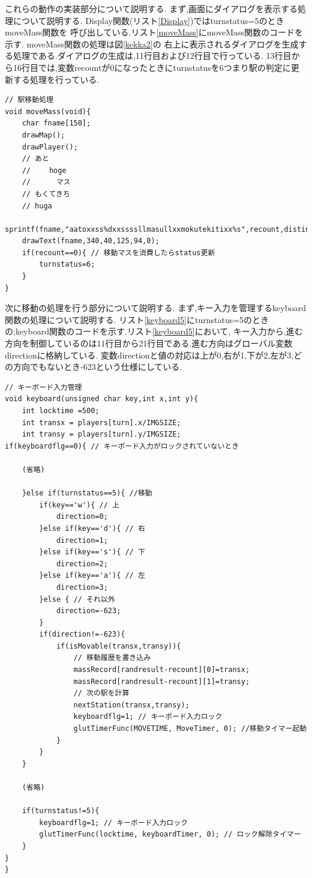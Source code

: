 \documentclass[a4j]{jarticle}
\begin{document}
    これらの動作の実装部分について説明する. まず,画面にダイアログを表示する処理について説明する. Display関数(リスト\ref{Display})ではturnstatus=5のときmoveMass関数を
    呼び出している.リスト\ref{moveMass}にmoveMass関数のコードを示す. moveMass関数の処理は図\ref{kekka2}の
    右上に表示されるダイアログを生成する処理である.ダイアログの生成は,11行目および12行目で行っている.
    13行目から16行目では,変数recountが0になったときにturnstatusを6つまり駅の判定に更新する処理を行っている.
        \begin{lstlisting}[basicstyle=\ttfamily\footnotesize, frame=single,label=moveMass,caption=moveMass関数]
// 駅移動処理
void moveMass(void){
    char fname[150];
    drawMap();
    drawPlayer();  
    // あと
    // 　　hoge
    // 　　　マス
    // もくてきち
    // huga
    sprintf(fname,"aatoxxss%dxxssssllmasullxxmokutekitixx%s",recount,distination.name);
    drawText(fname,340,40,125,94,0);  
    if(recount==0){ // 移動マスを消費したらstatus更新
        turnstatus=6;
    }
}
        \end{lstlisting}

    次に移動の処理を行う部分について説明する. まず,キー入力を管理するkeyboard関数の処理について説明する.
    リスト\ref{keyboard5}にturnstatus=5のときの,keyboard関数のコードを示す.リスト\ref{keyboard5}において,
    キー入力から,進む方向を制御しているのは11行目から21行目である.進む方向はグローバル変数directionに格納している.
    変数directionと値の対応は上が0,右が1,下が2,左が3,どの方向でもないとき-623という仕様にしている.

    \begin{lstlisting}[basicstyle=\ttfamily\footnotesize, frame=single,label=keyboard5,caption=移動のための入力処理]
// キーボード入力管理
void keyboard(unsigned char key,int x,int y){
    int locktime =500;
    int transx = players[turn].x/IMGSIZE;
    int transy = players[turn].y/IMGSIZE;
if(keyboardflg==0){ // キーボード入力がロックされていないとき

    (省略)

    }else if(turnstatus==5){ //移動
        if(key=='w'){ // 上
            direction=0;
        }else if(key=='d'){ // 右
            direction=1;
        }else if(key=='s'){ // 下
            direction=2;
        }else if(key=='a'){ // 左
            direction=3;
        }else { // それ以外
            direction=-623;
        }
        if(direction!=-623){
            if(isMovable(transx,transy)){
                // 移動履歴を書き込み
                massRecord[randresult-recount][0]=transx;
                massRecord[randresult-recount][1]=transy;
                // 次の駅を計算
                nextStation(transx,transy);
                keyboardflg=1; // キーボード入力ロック
                glutTimerFunc(MOVETIME, MoveTimer, 0); //移動タイマー起動
            }
        }   
    } 
    
    (省略)

    if(turnstatus!=5){
        keyboardflg=1; // キーボード入力ロック
        glutTimerFunc(locktime, keyboardTimer, 0); // ロック解除タイマー
    }
}
}
                \end{lstlisting}
\end{document}
